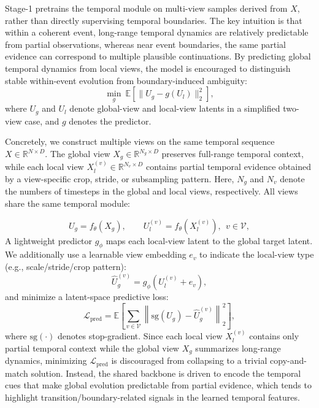 \documentclass{article}
\theoremstyle{plain}
\theoremstyle{definition}
\theoremstyle{remark}
\begin{document}
Stage-1 pretrains the temporal module on multi-view samples derived from $X$, rather than directly supervising temporal boundaries.
The key intuition is that within a coherent event, long-range temporal dynamics are relatively predictable from partial observations, whereas near event boundaries, the same partial evidence can correspond to multiple plausible continuations.
By predicting global temporal dynamics from local views, the model is encouraged to distinguish stable within-event evolution from boundary-induced ambiguity:
\begin{equation}
\min_{g}\ \mathbb{E}\!\left[\|U_g-g(U_l)\|_2^2\right],
\end{equation}
where $U_g$ and $U_l$ denote global-view and local-view latents in a simplified two-view case, and $g$ denotes the predictor.

Concretely, we construct multiple views on the same temporal sequence $X\in\mathbb{R}^{N\times D}$.
The global view $X_g\in\mathbb{R}^{N_g\times D}$ preserves full-range temporal context, while each local view $X_l^{(v)}\in\mathbb{R}^{N_v\times D}$ contains partial temporal evidence obtained by a view-specific crop, stride, or subsampling pattern.
Here, $N_g$ and $N_v$ denote the numbers of timesteps in the global and local views, respectively.
All views share the same temporal module:

\begin{equation}
U_g=f_\theta(X_g),\qquad U_l^{(v)}=f_\theta(X_l^{(v)}),\ \ v\in\mathcal{V},
\label{eq:view_latents}
\end{equation}
A lightweight predictor $g_\phi$ maps each local-view latent to the global target latent.
We additionally use a learnable view embedding $e_v$ to indicate the local-view type (e.g., scale/stride/crop pattern):
\begin{equation}
\hat{U}_g^{(v)} = g_{\phi}\!\left(U_l^{(v)} + e_v\right),
\label{eq:predictor_def_new}
\end{equation}
and minimize a latent-space predictive loss:
\begin{equation}
\mathcal{L}_{\mathrm{pred}}
=
\mathbb{E}
\left[
\sum_{v\in\mathcal{V}}
\left\|
\mathrm{sg}(U_g)
-
\hat{U}_g^{(v)}
\right\|_{2}^{2}
\right],
\label{eq:lp_pred_new}
\end{equation}
where $\mathrm{sg}(\cdot)$ denotes stop-gradient.
Since each local view $X_l^{(v)}$ contains only partial temporal context while the global view $X_g$ summarizes long-range dynamics, minimizing $\mathcal{L}_{\mathrm{pred}}$ is discouraged from collapsing to a trivial copy-and-match solution.
Instead, the shared backbone is driven to encode the temporal cues that make global evolution predictable from partial evidence, which tends to highlight transition/boundary-related signals in the learned temporal features.
\end{document}
